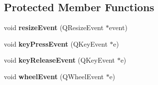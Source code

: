\subsection*{Protected Member Functions}
\begin{DoxyCompactItemize}
\item 
\hypertarget{class_main_window_ae12f8f63791595567b6250f8bb002bda}{}void {\bfseries resize\+Event} (Q\+Resize\+Event $\ast$event)\label{class_main_window_ae12f8f63791595567b6250f8bb002bda}

\item 
\hypertarget{class_main_window_adf88315e557e377353059bd313b1bfa6}{}void {\bfseries key\+Press\+Event} (Q\+Key\+Event $\ast$e)\label{class_main_window_adf88315e557e377353059bd313b1bfa6}

\item 
\hypertarget{class_main_window_a04b0c8ff3be04d1b1bf54e78c5ee7039}{}void {\bfseries key\+Release\+Event} (Q\+Key\+Event $\ast$e)\label{class_main_window_a04b0c8ff3be04d1b1bf54e78c5ee7039}

\item 
\hypertarget{class_main_window_ad2a20182d1ed20479debef57417cdb05}{}void {\bfseries wheel\+Event} (Q\+Wheel\+Event $\ast$e)\label{class_main_window_ad2a20182d1ed20479debef57417cdb05}

\end{DoxyCompactItemize}

